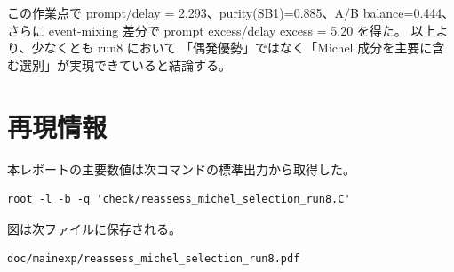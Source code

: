 \documentclass[a4paper,11pt]{jsarticle}
\begin{document}
この作業点で
prompt/delay = 2.293、purity(SB1)=0.885、A/B balance=0.444、
さらに event-mixing 差分で prompt excess/delay excess = 5.20 を得た。
以上より、少なくとも run8 において
「偶発優勢」ではなく「Michel 成分を主要に含む選別」が実現できていると結論する。

\section*{再現情報}
本レポートの主要数値は次コマンドの標準出力から取得した。
\begin{verbatim}
root -l -b -q 'check/reassess_michel_selection_run8.C'
\end{verbatim}
図は次ファイルに保存される。
\begin{verbatim}
doc/mainexp/reassess_michel_selection_run8.pdf
\end{verbatim}
\end{document}
